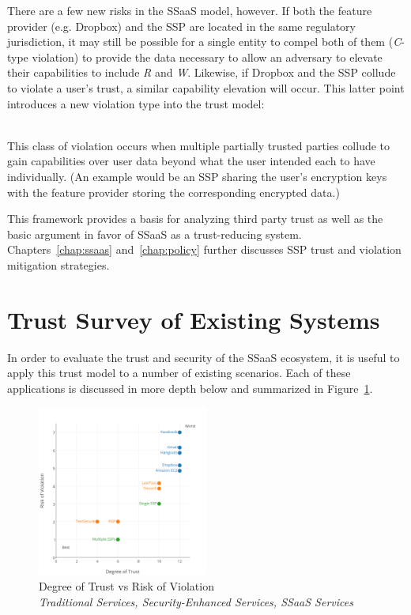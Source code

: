 There are a few new risks in the SSaaS model, however. If both the
feature provider (e.g. Dropbox) and the SSP are located in the same
regulatory jurisdiction, it may still be possible for a single entity
to compel both of them (\emph{C}-type violation) to provide the data
necessary to allow an adversary to elevate their capabilities to
include \emph{R} and \emph{W}. Likewise, if Dropbox and the SSP
collude to violate a user's trust, a similar capability elevation will
occur. This latter point introduces a new violation type into the
trust model:

\begin{packed_desc}
\item[Colluding (L):] \hfill \\ This class of violation occurs when
  multiple partially trusted parties collude to gain capabilities over
  user data beyond what the user intended each to have
  individually. (An example would be an SSP sharing the user's
  encryption keys with the feature provider storing the corresponding
  encrypted data.)
\end{packed_desc}

This framework provides a basis for analyzing third party trust as
well as the basic argument in favor of SSaaS as a trust-reducing
system. Chapters~\ref{chap:ssaas} and~\ref{chap:policy} further
discusses SSP trust and violation mitigation strategies.

\section{Trust Survey of Existing Systems}
\label{chap:trust:survey}

In order to evaluate the trust and security of the SSaaS ecosystem, it
is useful to apply this trust model to a number of existing
scenarios. Each of these applications is discussed in more depth below
and summarized in Figure~\ref{fig:trust:degvrisk}.

\begin{figure}[!t]
  \centering
  \includegraphics[width=0.5\textwidth]{./figs/pre/Trust-Chart-DegreeRisk-Traditional_Security_SSaaS.png}
  \caption[Degree of Trust vs Risk of Violation]{
    Degree of Trust vs Risk of Violation\\
    \textit{
      {\color{blue}Traditional Services},
      {\color{orange}Security-Enhanced Services},
      {\color{ForestGreen}SSaaS Services}}}
  \label{fig:trust:degvrisk}
\end{figure}


